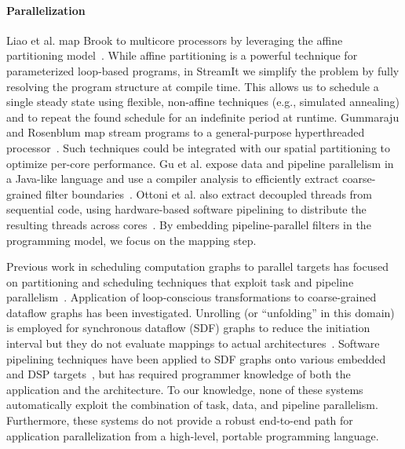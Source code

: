 \paragraph*{Parallelization}  Liao et al. map Brook to multicore processors 
by leveraging the affine partitioning model~\cite{liao06brook}.  While
affine partitioning is a powerful technique for parameterized
loop-based programs, in StreamIt we simplify the problem by fully
resolving the program structure at compile time.  This allows us to
schedule a single steady state using flexible, non-affine techniques
(e.g., simulated annealing) and to repeat the found schedule for an
indefinite period at runtime.  Gummaraju and Rosenblum map stream
programs to a general-purpose hyperthreaded
processor~\cite{gummaraju05micro}.  Such techniques could be
integrated with our spatial partitioning to optimize per-core
performance.  Gu et al. expose data and pipeline parallelism in a
Java-like language and use a compiler analysis to efficiently extract
coarse-grained filter boundaries~\cite{du03sc}.  Ottoni et al. also
extract decoupled threads from sequential code, using hardware-based
software pipelining to distribute the resulting threads across
cores~\cite{ottoni05decoupled}.  By embedding pipeline-parallel
filters in the programming model, we focus on the mapping step.

Previous work in scheduling computation graphs to parallel targets has
focused on partitioning and scheduling techniques that exploit task
and pipeline parallelism~\cite{SDFSched, SDFSched2,may87communicating,
DAGSched, pipeline-sdf}.  Application of loop-conscious
transformations to coarse-grained dataflow graphs has been
investigated.  Unrolling (or ``unfolding'' in this domain) is employed
for synchronous dataflow (SDF) graphs to reduce the initiation
interval but they do not evaluate mappings to actual
architectures~\cite{unfolding,unfolding2}. Software pipelining
techniques have been applied to SDF graphs onto various embedded and
DSP targets~\cite{bakshi99,chatha-02}, but has required programmer
knowledge of both the application and the architecture. To our
knowledge, none of these systems automatically exploit the combination
of task, data, and pipeline parallelism.  Furthermore, these systems
do not provide a robust end-to-end path for application
parallelization from a high-level, portable programming language.

